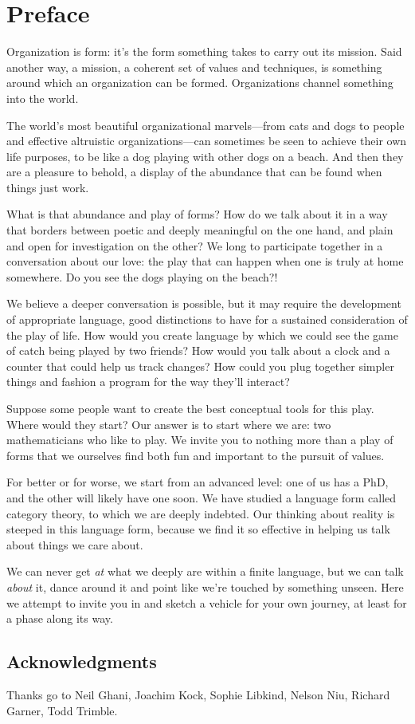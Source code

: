 \documentclass[DynamicalBook]{subfiles}
\begin{document}
%


\setcounter{chapter}{0}%


\chapter{Preface}\label{chapter.0}

Organization is form: it's the form something takes to carry out its mission. Said another way, a mission, a coherent set of values and techniques, is something around which an organization can be formed. Organizations channel something into the world.

 The world's most beautiful organizational marvels---from cats and dogs to people and effective altruistic organizations---can sometimes be seen to achieve their own life purposes, to be like a dog playing with other dogs on a beach. And then they are a pleasure to behold, a display of the abundance that can be found when things just work.

What is that abundance and play of forms? How do we talk about it in a way that borders between poetic and deeply meaningful on the one hand, and plain and open for investigation on the other? We long to participate together in a conversation about our love: the play that can happen when one is truly at home somewhere. Do you see the dogs playing on the beach?!

We believe a deeper conversation is possible, but it may require the development of appropriate language, good distinctions to have for a sustained consideration of the play of life. How would you create language by which we could see the game of catch being played by two friends? How would you talk about a clock and a counter that could help us track changes? How could you  plug together simpler things and fashion a program for the way they'll interact?

Suppose some people want to create the best conceptual tools for this play. Where would they start? Our answer is to start where we are: two mathematicians who like to play. We invite you to nothing more than a play of forms that we ourselves find both fun and important to the pursuit of  values.

For better or for worse, we start from an advanced level: one of us has a PhD, and the other will likely have one soon. We have studied a language form called category theory, to which we are deeply indebted. Our thinking about reality is steeped in this language form, because we find it so effective in helping us talk about things we care about.

We can never get \emph{at} what we deeply are within a finite language, but we can talk \emph{about} it, dance around it and point like we're touched by something unseen. Here we attempt to invite you in and sketch a vehicle for your own journey, at least for a phase along its way. 


\section*{Acknowledgments}

Thanks go to Neil Ghani, Joachim Kock, Sophie Libkind, Nelson Niu, Richard Garner, Todd Trimble.
\end{document}
